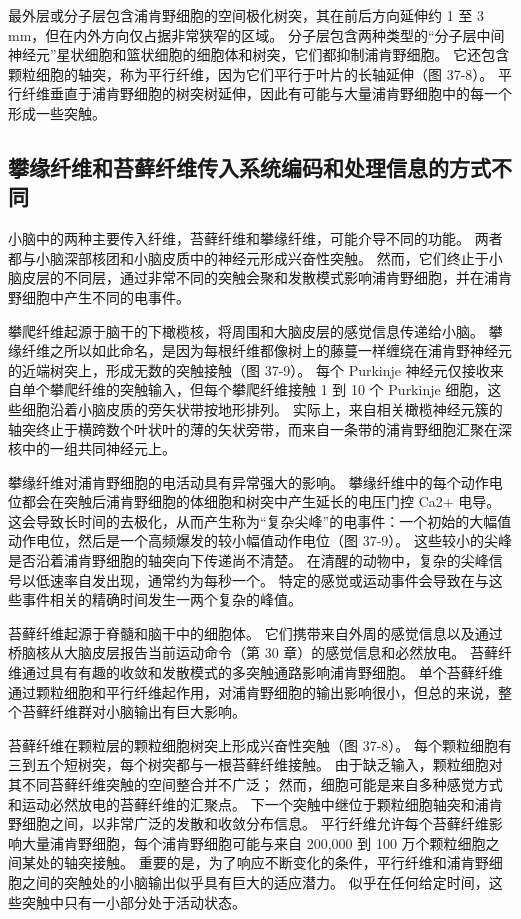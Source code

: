最外层或分子层包含浦肯野细胞的空间极化树突，其在前后方向延伸约 1 至 3 mm，但在内外方向仅占据非常狭窄的区域。 分子层包含两种类型的“分子层中间神经元”星状细胞和篮状细胞的细胞体和树突，它们都抑制浦肯野细胞。 它还包含颗粒细胞的轴突，称为平行纤维，因为它们平行于叶片的长轴延伸（图 37-8）。 平行纤维垂直于浦肯野细胞的树突树延伸，因此有可能与大量浦肯野细胞中的每一个形成一些突触。

\subsection{攀缘纤维和苔藓纤维传入系统编码和处理信息的方式不同}
小脑中的两种主要传入纤维，苔藓纤维和攀缘纤维，可能介导不同的功能。 两者都与小脑深部核团和小脑皮质中的神经元形成兴奋性突触。 然而，它们终止于小脑皮层的不同层，通过非常不同的突触会聚和发散模式影响浦肯野细胞，并在浦肯野细胞中产生不同的电事件。

攀爬纤维起源于脑干的下橄榄核，将周围和大脑皮层的感觉信息传递给小脑。 攀缘纤维之所以如此命名，是因为每根纤维都像树上的藤蔓一样缠绕在浦肯野神经元的近端树突上，形成无数的突触接触（图 37-9）。 每个 Purkinje 神经元仅接收来自单个攀爬纤维的突触输入，但每个攀爬纤维接触 1 到 10 个 Purkinje 细胞，这些细胞沿着小脑皮质的旁矢状带按地形排列。 实际上，来自相关橄榄神经元簇的轴突终止于横跨数个叶状叶的薄的矢状旁带，而来自一条带的浦肯野细胞汇聚在深核中的一组共同神经元上。

攀缘纤维对浦肯野细胞的电活动具有异常强大的影响。 攀缘纤维中的每个动作电位都会在突触后浦肯野细胞的体细胞和树突中产生延长的电压门控 Ca2+ 电导。 这会导致长时间的去极化，从而产生称为“复杂尖峰”的电事件：一个初始的大幅值动作电位，然后是一个高频爆发的较小幅值动作电位（图 37-9）。 这些较小的尖峰是否沿着浦肯野细胞的轴突向下传递尚不清楚。 在清醒的动物中，复杂的尖峰信号以低速率自发出现，通常约为每秒一个。 特定的感觉或运动事件会导致在与这些事件相关的精确时间发生一两个复杂的峰值。

苔藓纤维起源于脊髓和脑干中的细胞体。 它们携带来自外周的感觉信息以及通过桥脑核从大脑皮层报告当前运动命令（第 30 章）的感觉信息和必然放电。 苔藓纤维通过具有有趣的收敛和发散模式的多突触通路影响浦肯野细胞。 单个苔藓纤维通过颗粒细胞和平行纤维起作用，对浦肯野细胞的输出影响很小，但总的来说，整个苔藓纤维群对小脑输出有巨大影响。

苔藓纤维在颗粒层的颗粒细胞树突上形成兴奋性突触（图 37-8）。 每个颗粒细胞有三到五个短树突，每个树突都与一根苔藓纤维接触。 由于缺乏输入，颗粒细胞对其不同苔藓纤维突触的空间整合并不广泛； 然而，细胞可能是来自多种感觉方式和运动必然放电的苔藓纤维的汇聚点。 下一个突触中继位于颗粒细胞轴突和浦肯野细胞之间，以非常广泛的发散和收敛分布信息。 平行纤维允许每个苔藓纤维影响大量浦肯野细胞，每个浦肯野细胞可能与来自 200,000 到 100 万个颗粒细胞之间某处的轴突接触。 重要的是，为了响应不断变化的条件，平行纤维和浦肯野细胞之间的突触处的小脑输出似乎具有巨大的适应潜力。 似乎在任何给定时间，这些突触中只有一小部分处于活动状态。

